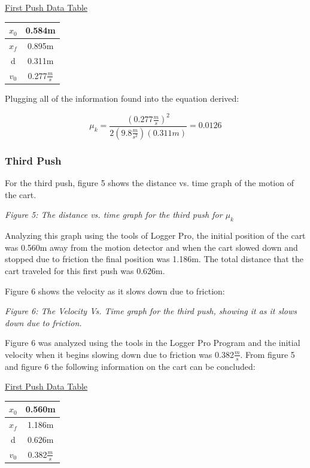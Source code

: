 \documentclass[aps,letterpaper,11pt]{revtex4}
\begin{document}
\begin{center}
\underline{First Push Data Table}\\
\begin{tabular}{|c|c|}
\hline
$x_0$ & 0.584m \\
\hline
$x_f$ & 0.895m \\
\hline
d & 0.311m\\
\hline
$v_0$ & 0.277$\frac{m}{s}$\\
\hline
\end{tabular}
\end{center}

Plugging all of the information found into the equation derived:

$$ \mu_k=\frac{(0.277\frac{m}{s})^2}{2(9.8\frac{m}{s^2})(0.311m)} = 0.0126$$

\subsubsection{Third Push}

For the third push, figure 5 shows the distance vs. time graph of the motion of the cart. 

\begin{center}

\textit{Figure 5: The distance vs. time graph for the third push for $\mu_k$}\\
\end{center}

Analyzing this graph using the tools of Logger Pro, the initial position of the cart was 0.560m away from the motion detector and when the cart slowed down and stopped due to friction the final position was 1.186m. The total distance that the cart traveled for this first push was 0.626m.

Figure 6 shows the velocity as it slows down due to friction:

\begin{center}

\textit{Figure 6: The Velocity Vs. Time graph for the third push, showing it as it slows down due to friction.}\\
\end{center}

Figure 6 was analyzed using the tools in the Logger Pro Program and the initial velocity when it begins slowing down due to friction was 0.382$\frac{m}{s}$. From figure 5 and figure 6 the following information on the cart can be concluded:

\begin{center}
\underline{First Push Data Table}\\
\begin{tabular}{|c|c|}
\hline
$x_0$ & 0.560m \\
\hline
$x_f$ & 1.186m \\
\hline
d & 0.626m\\
\hline
$v_0$ & 0.382$\frac{m}{s}$\\
\hline
\end{tabular}
\end{center}
\end{document}
